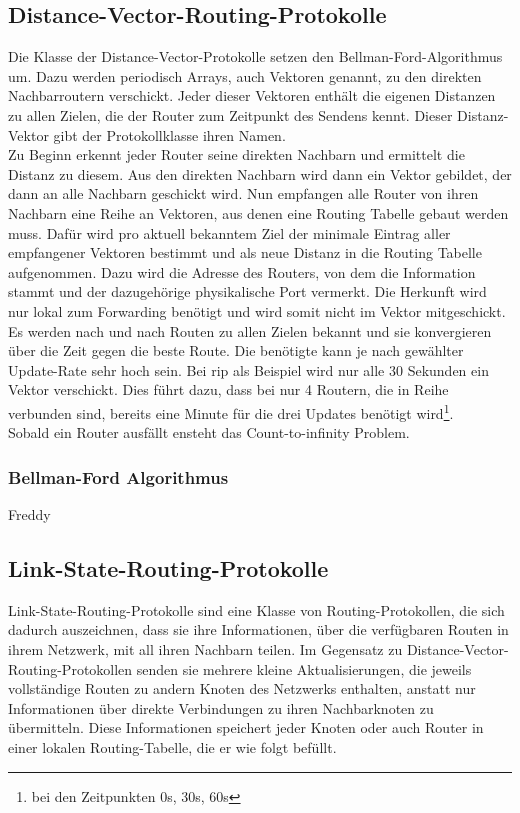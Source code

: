 \documentclass[1pt,a4paper,final]{article}
\begin{document}
\subsection{Distance-Vector-Routing-Protokolle}
Die Klasse der Distance-Vector-Protokolle setzen den Bellman-Ford-Algorithmus um. Dazu werden periodisch Arrays, auch Vektoren genannt, zu den direkten Nachbarroutern verschickt. Jeder dieser Vektoren enthält die eigenen Distanzen zu allen Zielen, die der Router zum Zeitpunkt des Sendens kennt. Dieser Distanz-Vektor gibt der Protokollklasse ihren Namen. \\
Zu Beginn erkennt jeder Router seine direkten Nachbarn und ermittelt die Distanz zu diesem. Aus den direkten Nachbarn wird dann ein Vektor gebildet, der dann an alle Nachbarn geschickt wird. Nun empfangen alle Router von ihren Nachbarn eine Reihe an Vektoren, aus denen eine Routing Tabelle gebaut werden muss. Dafür wird pro aktuell bekanntem Ziel der minimale Eintrag aller empfangener Vektoren bestimmt und als neue Distanz in die Routing Tabelle aufgenommen. Dazu wird die Adresse des Routers, von dem die Information stammt und der dazugehörige physikalische Port vermerkt. Die Herkunft wird nur lokal zum Forwarding benötigt und wird somit nicht im Vektor mitgeschickt.\\
Es werden nach und nach Routen zu allen Zielen bekannt und sie konvergieren über die Zeit gegen die beste Route. Die benötigte kann je nach gewählter Update-Rate sehr hoch sein. Bei \ac{rip} als Beispiel wird nur alle 30 Sekunden ein Vektor verschickt. Dies führt dazu, dass bei nur 4 Routern, die in Reihe verbunden sind, bereits eine Minute für  die drei Updates benötigt wird\footnote{bei den Zeitpunkten 0s, 30s, 60s}. \\
Sobald ein Router ausfällt ensteht das Count-to-infinity Problem. 

\subsubsection{Bellman-Ford Algorithmus}
Freddy
\subsection{Link-State-Routing-Protokolle}
Link-State-Routing-Protokolle sind eine Klasse von Routing-Protokollen, die sich dadurch auszeichnen, dass sie ihre Informationen, über die verfügbaren Routen in ihrem Netzwerk, mit all ihren Nachbarn teilen. 
Im Gegensatz zu Distance-Vector-Routing-Protokollen senden sie mehrere kleine Aktualisierungen, die jeweils vollständige Routen zu andern Knoten des Netzwerks enthalten, anstatt nur Informationen über direkte Verbindungen zu ihren Nachbarknoten zu übermitteln. 
Diese Informationen speichert jeder Knoten oder auch Router in einer lokalen Routing-Tabelle, die er wie folgt befüllt.
\end{document}
